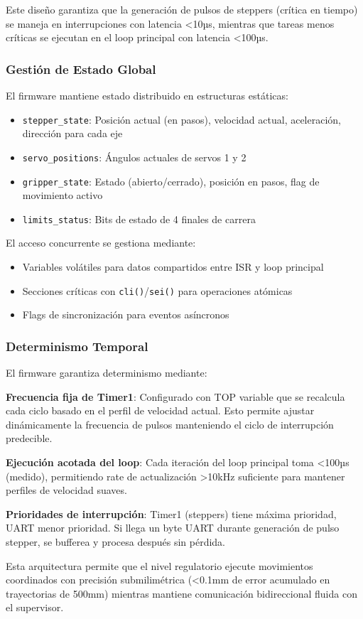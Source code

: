 Este diseño garantiza que la generación de pulsos de steppers (crítica en tiempo) se maneja en interrupciones con latencia <10µs, mientras que tareas menos críticas se ejecutan en el loop principal con latencia <100µs.

\subsubsection{Gestión de Estado Global}

El firmware mantiene estado distribuido en estructuras estáticas:

\begin{itemize}
    \item \texttt{stepper\_state}: Posición actual (en pasos), velocidad actual, aceleración, dirección para cada eje
    \item \texttt{servo\_positions}: Ángulos actuales de servos 1 y 2
    \item \texttt{gripper\_state}: Estado (abierto/cerrado), posición en pasos, flag de movimiento activo
    \item \texttt{limits\_status}: Bits de estado de 4 finales de carrera
\end{itemize}

El acceso concurrente se gestiona mediante:
\begin{itemize}
    \item Variables volátiles para datos compartidos entre ISR y loop principal
    \item Secciones críticas con \texttt{cli()}/\texttt{sei()} para operaciones atómicas
    \item Flags de sincronización para eventos asíncronos
\end{itemize}

\subsubsection{Determinismo Temporal}

El firmware garantiza determinismo mediante:

\textbf{Frecuencia fija de Timer1}: Configurado con TOP variable que se recalcula cada ciclo basado en el perfil de velocidad actual. Esto permite ajustar dinámicamente la frecuencia de pulsos manteniendo el ciclo de interrupción predecible.

\textbf{Ejecución acotada del loop}: Cada iteración del loop principal toma <100µs (medido), permitiendo rate de actualización >10kHz suficiente para mantener perfiles de velocidad suaves.

\textbf{Prioridades de interrupción}: Timer1 (steppers) tiene máxima prioridad, UART menor prioridad. Si llega un byte UART durante generación de pulso stepper, se bufferea y procesa después sin pérdida.

Esta arquitectura permite que el nivel regulatorio ejecute movimientos coordinados con precisión submilimétrica (<0.1mm de error acumulado en trayectorias de 500mm) mientras mantiene comunicación bidireccional fluida con el supervisor.
